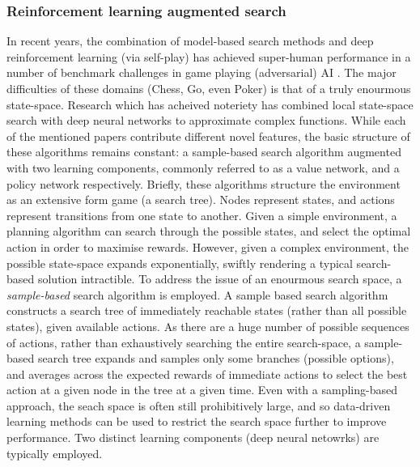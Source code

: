 \subsubsection{Reinforcement learning augmented search} \label{RL + Search}
In recent years, the combination of model-based search methods and deep reinforcement learning (via self-play) has achieved super-human performance in a number of benchmark challenges in game playing (adversarial) AI \cite{AlphaGo,Brown2020,Lerer2019}. 
The major difficulties of these domains (Chess, Go, even Poker) is that of a truly enourmous state-space. Research which has acheived noteriety has combined local state-space search with deep neural networks to approximate complex functions. 
\newline \newline
While each of the mentioned papers contribute different novel features, the basic structure of these algorithms remains constant: a sample-based search algorithm augmented with two learning components, commonly referred to as a value network, and a policy network respectively.
\newline \newline
Briefly, these algorithms structure the environment as an extensive form game (a search tree). Nodes represent states, and actions represent transitions from one state to another. Given a simple environment, a planning algorithm can search through the possible states, and select the optimal action in order to maximise rewards. However, given a complex environment, the possible state-space expands exponentially, swiftly rendering a typical search-based solution intractible. To address the issue of an enourmous search space, a \textit{sample-based} search algorithm is employed. 
\newline \newline
A sample based search algorithm constructs a search tree of immediately reachable states (rather than all possible states), given available actions. As there are a huge number of possible sequences of actions, rather than exhaustively searching the entire search-space, a sample-based search tree expands and samples only some branches (possible options), and averages across the expected rewards of immediate actions to select the best action at a given node in the tree at a given time.
\newline \newline
Even with a sampling-based approach, the seach space is often still prohibitively large, and so data-driven learning methods can be used to restrict the search space further to improve performance. Two distinct learning components (deep neural netowrks) are typically employed.  
